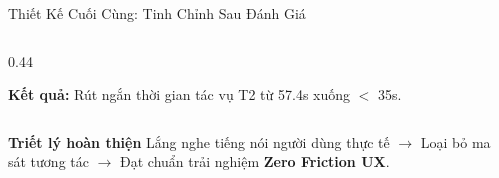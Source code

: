 \begin{frame}{Thiết Kế Cuối Cùng: Tinh Chỉnh Sau Đánh Giá}
\begin{columns}[T]
\begin{column}{0.44\textwidth}
      \vspace{0.5mm}
      \begin{center}
        \scriptsize \color{PetcareSuccess}
        \textbf{Kết quả:} Rút ngắn thời gian tác vụ T2 từ 57.4s xuống $<$ 35s.
      \end{center}
    \end{column}
  \end{columns}

  \vspace{1.5mm}
  \begin{block}{\centering \scriptsize \textbf{Triết lý hoàn thiện}}
    \centering \tiny
    Lắng nghe tiếng nói người dùng thực tế $\rightarrow$ Loại bỏ ma sát tương tác $\rightarrow$ Đạt chuẩn trải nghiệm \textbf{Zero Friction UX}.
  \end{block}
\end{frame}

